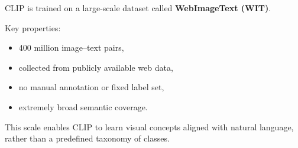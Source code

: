 CLIP is trained on a large-scale dataset called \textbf{WebImageText (WIT)}.

\vspace{0.6em}
Key properties:
\begin{itemize}
    \item 400 million image--text pairs,
    \item collected from publicly available web data,
    \item no manual annotation or fixed label set,
    \item extremely broad semantic coverage.
\end{itemize}

\vspace{0.6em}
This scale enables CLIP to learn visual concepts aligned with natural language,
rather than a predefined taxonomy of classes.
